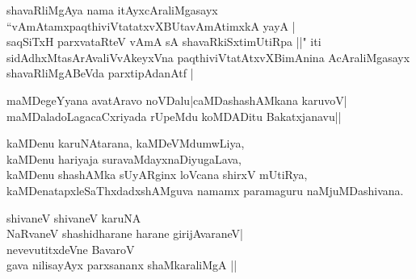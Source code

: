 \begin{entry}
\begin{shl}
shavaRliMgAya nama itAyxcAraliMgasayx ``vAmAtamxpaqthiviVtatatxvXBUtavAmAtimxkA yayA |\\
saqSiTxH parxvataRteV vAmA sA shavaRkiSxtimUtiRpa ||"
iti sidAdhxMtasArAvaliVvAkeyxVna paqthiviVtatAtxvXBimAnina AcAraliMgasayx shavaRliMgABeVda parxtipAdanAtf |
\end{shl}
\end{entry}

\begin{entry}
\begin{shl}
maMDegeYyana avatAravo noVDalu|caMDashashAMkana karuvoV|\\
maMDaladoLagacaCxriyada rUpeMdu koMDADitu Bakatxjanavu||
\end{shl}
\end{entry}

\begin{entry}
\begin{shl}
kaMDenu karuNAtarana, kaMDeVMdumwLiya,\\
kaMDenu hariyaja suravaMdayxnaDiyugaLava,\\
kaMDenu shashAMka sUyARginx loVcana shirxV mUtiRya,\\
kaMDenatapxleSaThxdadxshAMguva namamx paramaguru naMjuMDashivana.
\end{shl}
\end{entry}

\begin{entry}
\gl{}
\begin{shl}
shivaneV shivaneV karuNA\\
NaRvaneV shashidharane harane girijAvaraneV|\\
nevevutitxdeVne BavaroV\\
gava nilisayAyx parxsananx shaMkaraliMgA ||
\end{shl}
\end{entry}

\begin{entry}
\end{entry}

